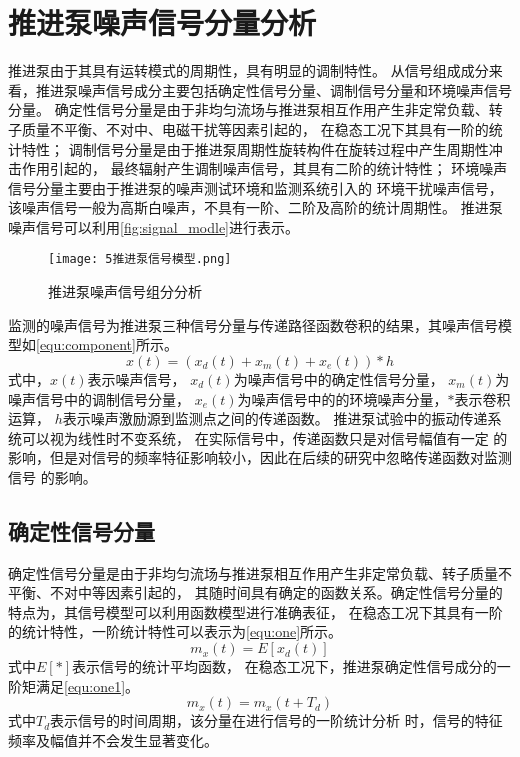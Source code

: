 \section{推进泵噪声信号分量分析}
推进泵由于其具有运转模式的周期性，具有明显的调制特性。
从信号组成成分来看，推进泵噪声信号成分主要包括确定性信号分量、调制信号分量和环境噪声信号分量。
确定性信号分量是由于非均匀流场与推进泵相互作用产生非定常负载、转子质量不平衡、不对中、电磁干扰等因素引起的，
在稳态工况下其具有一阶的统计特性；
调制信号分量是由于推进泵周期性旋转构件在旋转过程中产生周期性冲击作用引起的，
最终辐射产生调制噪声信号，其具有二阶的统计特性；
环境噪声信号分量主要由于推进泵的噪声测试环境和监测系统引入的
环境干扰噪声信号，该噪声信号一般为高斯白噪声，不具有一阶、二阶及高阶的统计周期性\cite{antoniCyclostationaryModellingRotating2004a,song2019}。
推进泵噪声信号可以利用\autoref{fig:signal_modle}进行表示。
\begin{figure}[htbp]
    \centering
    \texttt{[image: 5推进泵信号模型.png]}
    \caption{\label{fig:signal_modle}推进泵噪声信号组分分析}
\end{figure}

监测的噪声信号为推进泵三种信号分量与传递路径函数卷积的结果，其噪声信号模型如\autoref{equ:component}所示。 
\begin{equation}
    \label{equ:component}
    x\left ( t \right ) =\left ( x_d\left ( t \right )+x_m\left ( t \right )+x_e\left ( t \right ) \right )\ast h 
\end{equation}
式中，$x\left ( t \right )$表示噪声信号，
$x_d\left ( t \right )$为噪声信号中的确定性信号分量，
$x_m\left ( t \right )$为噪声信号中的调制信号分量，
$x_e\left ( t \right )$为噪声信号中的的环境噪声分量，$\ast$表示卷积运算，
$h$表示噪声激励源到监测点之间的传递函数。 
推进泵试验中的振动传递系统可以视为线性时不变系统，
在实际信号中，传递函数只是对信号幅值有一定
的影响，但是对信号的频率特征影响较小，因此在后续的研究中忽略传递函数对监测信号
的影响\cite{song2019}。 

\subsection{确定性信号分量}
确定性信号分量是由于非均匀流场与推进泵相互作用产生非定常负载、转子质量不平衡、不对中等因素引起的，
其随时间具有确定的函数关系。确定性信号分量的特点为，其信号模型可以利用函数模型进行准确表征，
在稳态工况下其具有一阶的统计特性，一阶统计特性可以表示为\autoref{equ:one}所示。
\begin{equation}
    \label{equ:one}
    m_{x}\left ( t \right ) =E\left [ x_{d}\left ( t   \right )  \right ]
\end{equation}
式中$E[*]$表示信号的统计平均函数，
在稳态工况下，推进泵确定性信号成分的一阶矩满足\autoref{equ:one1}。
\begin{equation}
    \label{equ:one1}
    m_{x}\left ( t \right ) =m_{x}\left ( t+T_d \right )
\end{equation}
式中$T_{d}$表示信号的时间周期，该分量在进行信号的一阶统计分析
时，信号的特征频率及幅值并不会发生显著变化。
